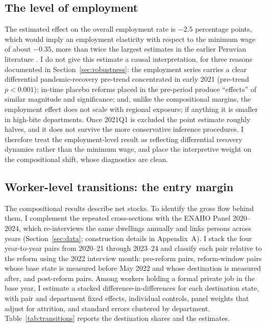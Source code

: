 \subsection{The level of employment}

The estimated effect on the overall employment rate is $-2.5$ percentage points, which would imply an employment elasticity with respect to the minimum wage of about $-0.35$, more than twice the largest estimates in the earlier Peruvian literature \citep{cespedes_2005}. I do not give this estimate a causal interpretation, for three reasons documented in Section~\ref{sec:robustness}: the employment series carries a clear differential pandemic-recovery pre-trend concentrated in early 2021 (pre-trend $p<0.001$); in-time placebo reforms placed in the pre-period produce ``effects'' of similar magnitude and significance; and, unlike the compositional margins, the employment effect does not scale with regional exposure; if anything it is smaller in high-bite departments. Once 2021Q1 is excluded the point estimate roughly halves, and it does not survive the more conservative inference procedures. I therefore treat the employment-level result as reflecting differential recovery dynamics rather than the minimum wage, and place the interpretive weight on the compositional shift, whose diagnostics are clean.

\subsection{Worker-level transitions: the entry margin}\label{sec:transitions}

The compositional results describe net stocks. To identify the gross flow behind them, I complement the repeated cross-sections with the ENAHO Panel 2020--2024, which re-interviews the same dwellings annually and links persons across years (Section~\ref{sec:data}; construction details in Appendix~A). I stack the four year-to-year pairs from 2020--21 through 2023--24 and classify each pair relative to the reform using the 2022 interview month: pre-reform pairs, reform-window pairs whose base state is measured before May 2022 and whose destination is measured after, and post-reform pairs. Among workers holding a formal private job in the base year, I estimate a stacked difference-in-differences for each destination state, with pair and department fixed effects, individual controls, panel weights that adjust for attrition, and standard errors clustered by department. Table~\ref{tab:transitions} reports the destination shares and the estimates.

